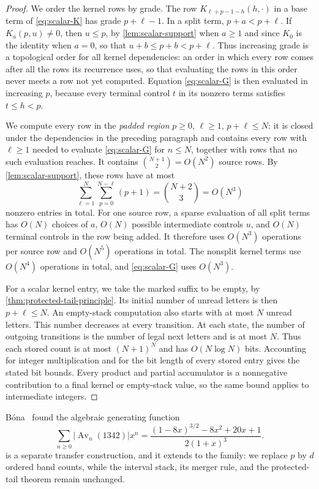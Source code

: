 \documentclass[11pt,reqno]{amsart}
\theoremstyle{definition}
\theoremstyle{remark}
\newcommand{\Av}{\operatorname{Av}}
\begin{document}
\begin{proof}
We order the kernel rows by grade.  The row
$K_{\ell+p-1-h}(h,\mathord\cdot)$ in a base term of \eqref{eq:scalar-K} has
grade $p+\ell-1$.  In a split term, $p+a<p+\ell$.  If
$K_a(p,u)\neq0$, then $u\leq p$, by \cref{lem:scalar-support} when $a\geq1$
and since $K_0$ is the identity when $a=0$, so that $u+b\leq p+b<p+\ell$.
Thus increasing grade
is a topological order for all kernel dependencies: an order in which every
row comes after all the rows its recurrence uses, so that evaluating the rows
in this order never meets a row not yet computed.  Equation
\eqref{eq:scalar-G} is then evaluated in increasing $p$, because every
terminal control $t$ in its nonzero terms satisfies
$t\leq h<p$.

We compute every row in the \emph{padded region} $p\geq0$, $\ell\geq1$,
$p+\ell\leq N$: it is closed under the dependencies in the preceding
paragraph and contains every row with $\ell\geq1$ needed to evaluate
\eqref{eq:scalar-G} for $n\leq N$, together with rows that no such
evaluation reaches.  It contains
$\binom{N+1}{2}=O(N^2)$ source rows.  By
\cref{lem:scalar-support}, these rows have at most
\[
 \sum_{\ell=1}^N\sum_{p=0}^{N-\ell}(p+1)
 =\binom{N+2}{3}=O(N^3)
\]
nonzero entries in total.  For one source row, a sparse evaluation
of all split terms has $O(N)$ choices of $a$, $O(N)$ possible intermediate
controls $u$, and $O(N)$ terminal controls in the row being added.  It
therefore uses $O(N^3)$ operations per source row and $O(N^5)$ operations in
total.  The nonsplit kernel terms use $O(N^4)$ operations in total, and
\eqref{eq:scalar-G} uses $O(N^3)$.

For a scalar kernel entry, we take the marked suffix to be empty, by
\cref{thm:protected-tail-principle}.  Its initial number of unread letters is then
$p+\ell\leq N$.  An empty-stack computation also starts with at most $N$
unread letters.  This number decreases at every transition.  At each state,
the number of outgoing transitions is the number of legal next letters and
is at most $N$.  Thus each stored count is
at most $(N+1)^N$ and has $O(N\log N)$ bits.  Accounting for integer
multiplication and for the bit length of every stored entry gives the stated
bit bounds.  Every product and partial accumulator is a nonnegative
contribution to a final kernel or empty-stack value, so the same bound applies
to intermediate integers.
\end{proof}

B\'ona~\cite{Bona1997} found the algebraic generating function
\begin{equation}\label{eq:bona-1342}
 \sum_{n\geq0}\lvert\Av_n(1342)\rvert x^n
 =\frac{(1-8x)^{3/2}-8x^2+20x+1}{2(1+x)^3}.
\end{equation}
 is a separate transfer construction, and it
extends to the family: we replace $p$ by $d$ ordered band counts, while the
interval stack, its merger rule, and the protected-tail theorem remain
unchanged.
\end{document}
